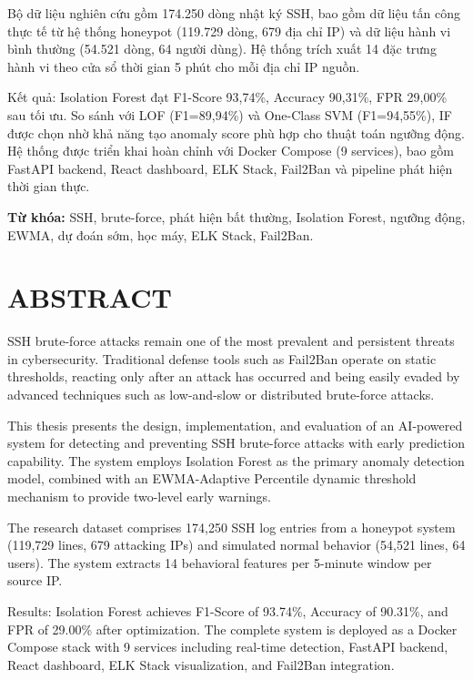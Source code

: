 \documentclass[
  a4paper]{report}
\begin{document}
Bộ dữ liệu nghiên cứu gồm 174.250 dòng nhật ký SSH, bao gồm dữ liệu tấn
công thực tế từ hệ thống honeypot (119.729 dòng, 679 địa chỉ IP) và dữ
liệu hành vi bình thường (54.521 dòng, 64 người dùng). Hệ thống trích
xuất 14 đặc trưng hành vi theo cửa sổ thời gian 5 phút cho mỗi địa chỉ
IP nguồn.

Kết quả: Isolation Forest đạt F1-Score 93,74\%, Accuracy 90,31\%, FPR
29,00\% sau tối ưu. So sánh với LOF (F1=89,94\%) và One-Class SVM
(F1=94,55\%), IF được chọn nhờ khả năng tạo anomaly score phù hợp cho
thuật toán ngưỡng động. Hệ thống được triển khai hoàn chỉnh với Docker
Compose (9 services), bao gồm FastAPI backend, React dashboard, ELK
Stack, Fail2Ban và pipeline phát hiện thời gian thực.

\textbf{Từ khóa:} SSH, brute-force, phát hiện bất thường, Isolation
Forest, ngưỡng động, EWMA, dự đoán sớm, học máy, ELK Stack, Fail2Ban.

\newpage

\chapter*{ABSTRACT}\label{abstract}

SSH brute-force attacks remain one of the most prevalent and persistent
threats in cybersecurity. Traditional defense tools such as Fail2Ban
operate on static thresholds, reacting only after an attack has occurred
and being easily evaded by advanced techniques such as low-and-slow or
distributed brute-force attacks.

This thesis presents the design, implementation, and evaluation of an
AI-powered system for detecting and preventing SSH brute-force attacks
with early prediction capability. The system employs Isolation Forest as
the primary anomaly detection model, combined with an EWMA-Adaptive
Percentile dynamic threshold mechanism to provide two-level early
warnings.

The research dataset comprises 174,250 SSH log entries from a honeypot
system (119,729 lines, 679 attacking IPs) and simulated normal behavior
(54,521 lines, 64 users). The system extracts 14 behavioral features per
5-minute window per source IP.

Results: Isolation Forest achieves F1-Score of 93.74\%, Accuracy of
90.31\%, and FPR of 29.00\% after optimization. The complete system is
deployed as a Docker Compose stack with 9 services including real-time
detection, FastAPI backend, React dashboard, ELK Stack visualization,
and Fail2Ban integration.
\end{document}
